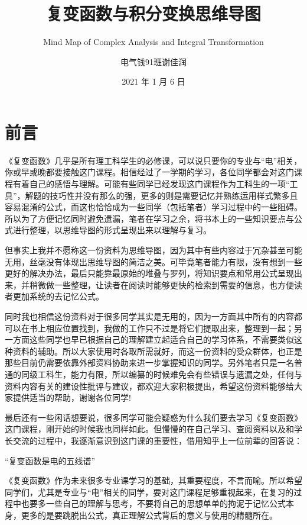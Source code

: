 \documentclass[
  10pt,
  twoside,
  openany,
  b5paper, %
  colorscheme = basic, %
]{qyxf-book}
\title{复变函数与积分变换思维导图}
\subtitle{Mind Map of Complex Analysis and Integral Transformation}  %
\author{电气钱91班谢佳润}
\date{2021 年 1 月 6 日}
\begin{document}
\maketitle

\chapter*{前言}
\thispagestyle{empty}

《复变函数》几乎是所有理工科学生的必修课，可以说只要你的专业与“电”相关，你或早或晚都要接触这门课程。相信经过了一学期的学习，各位同学都会对这门课程有着自己的感悟与理解。可能有些同学已经发现这门课程作为工科生的一项“工具”，解题的技巧性并没有那么的强，更多的则是需要记忆并熟练运用样式繁多且容易混淆的公式，而这也恰恰成为一些同学（包括笔者）学习过程中的一些阻碍。所以为了方便记忆同时避免遗漏，笔者在学习之余，将书本上的一些知识要点与公式进行整理，以思维导图的形式呈现出来以理解与复习。

但事实上我并不愿称这一份资料为思维导图，因为其中有些内容过于冗杂甚至可能无用，丝毫没有体现出思维导图的简洁之美。可毕竟笔者能力有限，没有想到一些更好的解决办法，最后只能靠最原始的堆叠与罗列，将知识要点和常用公式呈现出来，并稍微做一些整理，让读者在阅读时能够更快的检索到需要的信息，也方便读者更加系统的去记忆公式。

同时我也相信这份资料对于很多同学其实是无用的，因为一方面其中所有的内容都可以在书上相应位置找到，我做的工作只不过是将它们提取出来，整理到一起；另一方面这些同学也早已根据自己的理解建立起适合自己的学习体系，不需要类似这种资料的辅助。所以大家使用时各取所需就好，而这一份资料的受众群体，也正是那些目前仍需要依靠外部资料协助来进一步掌握知识的同学。另外笔者只是一名普通的同级工科生，能力有限，所以编纂的时候难免会有些错误与遗漏之处，任何与资料内容有关的建设性批评与建议，都欢迎大家积极提出，希望这份资料能够给大家提供适当的帮助，谢谢各位同学!

最后还有一些闲话想要说，很多同学可能会疑惑为什么我们要去学习《复变函数》这门课程，刚开始的时候我也同样如此。但慢慢的在自己学习、查阅资料以及和学长交流的过程中，我逐渐意识到这门课的重要性，借用知乎上一位前辈的回答说：

“复变函数是电的五线谱”

《复变函数》作为未来很多专业课学习的基础，其重要程度，不言而喻。所以希望同学们，尤其是专业与“电”相关的同学，要对这门课程足够重视起来，在复习的过程中也要多一些自己的理解与思考，不要将自己的思想单单的拘泥于记忆公式本身，更多的是要跳脱出公式，真正理解公式背后的意义与使用的精髓所在。




\end{document}
